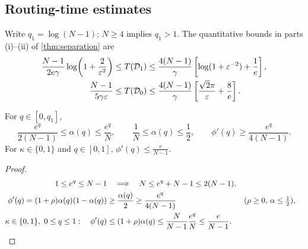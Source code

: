 \subsection{Routing-time estimates}
\label{app:routing-proof}
Write $q_1=\log(N-1)$; $N\ge4$ implies $q_1>1$.
The quantitative bounds in parts (i)--(ii) of \cref{thm:separation} are
\begin{align*}
 \frac{N-1}{2e\gamma}\log\!\left(1+\frac{2}{\varepsilon^2}\right)
 &\le T(\mathcal D_{1})\le\frac{4(N-1)}{\gamma}\left[\log(1+\varepsilon^{-2})+\frac{1}{e}\right],\\
 \frac{N-1}{5\gamma \varepsilon}
 &\le T(\mathcal D_{0})\le\frac{4(N-1)}{\gamma}\left[\frac{\sqrt2\pi}{\varepsilon}+\frac{8}{e}\right].
\end{align*}

\begin{lemma}
\label{lem:attention-bounds}
For $q\in[0,q_1]$,
\begin{equation}
 \frac{e^q}{2(N-1)}\le \alpha(q)\le\frac{e^q}{N},\qquad
 \frac{1}{N}\le \alpha(q)\le\frac{1}{2},\qquad
 \phi'(q)\ge\frac{e^q}{4(N-1)}.
 \label{eq:alpha-bounds}
\end{equation}
For $\kappa\in\{0,1\}$ and $q\in[0,1]$, $\phi'(q)\le \tfrac{e}{N-1}$.
\end{lemma}
\begin{proof}
\begin{align*}
 1\le e^q\le N-1
 &\quad\Longrightarrow\quad
 N\le e^q+N-1\le2(N-1),\\
 \phi'(q)=(1+\rho)\alpha(q)(1-\alpha(q))
 &\ge\frac{\alpha(q)}{2}\ge\frac{e^q}{4(N-1)}&&\text{($\rho\ge0$, $\alpha\le\tfrac12$)},\\
 \kappa\in\{0,1\},\ 0\le q\le1:\quad
 \phi'(q)&\le(1+\rho)\alpha(q)
 \le\frac{N}{N-1}\frac{e^q}{N}\le\frac{e}{N-1}.\qedhere
\end{align*}
\end{proof}

